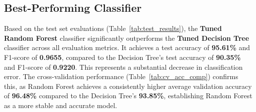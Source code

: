 \documentclass[12pt,a4paper]{article}
\begin{document}
\subsection{Best-Performing Classifier}
Based on the test set evaluations (Table~\ref{tab:test_results}), the \textbf{Tuned Random Forest} classifier significantly outperforms the \textbf{Tuned Decision Tree} classifier across all evaluation metrics. It achieves a test accuracy of \textbf{95.61\%} and F1-score of \textbf{0.9655}, compared to the Decision Tree's test accuracy of \textbf{90.35\%} and F1-score of \textbf{0.9220}. This represents a substantial decrease in classification error. The cross-validation performance (Table~\ref{tab:cv_acc_comp}) confirms this, as Random Forest achieves a consistently higher average validation accuracy of \textbf{96.48\%} compared to the Decision Tree's \textbf{93.85\%}, establishing Random Forest as a more stable and accurate model.
\end{document}

